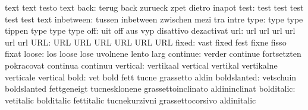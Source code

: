                            text                      text
                           testo                     text
                     back: terug                     back
                           zurueck                   zpet
                           dietro                    inapot
                     test: test                      test
                           test                      test
                           test                      text
                inbetween: tussen                    inbetween
                           zwischen                  mezi
                           tra                       intre
                     type: type                      type
                           tippen                    type
                           type                      type %
                      off: uit                       off
                           aus                       vyp
                           disattivo                 dezactivat
                      url: url                       url
                           url                       url
                           url                       url
                      URL: URL                       URL
                           URL                       URL
                           URL                       URL
                    fixed: vast                      fixed
                           fest                      fixne
                           fisso                     fixat
                    loose: los                       loose
                           lose                      uvolnene
                           lento                     larg
                 continue: verder                    continue
                           fortsetzten               pokracovat
                           continua                  continuu
                 vertical: vertikaal                 vertical
                           vertikal                  vertikalne
                           verticale                 vertical
                     bold: vet                       bold
                           fett                      tucne
                           grassetto                 aldin
              boldslanted: vetschuin                 boldslanted
                           fettgeneigt               tucnesklonene
                           grassettoinclinato        aldininclinat
               bolditalic: vetitalic                 bolditalic
                           fettitalic                tucnekurzivni
                           grassettocorsivo          aldinitalic
